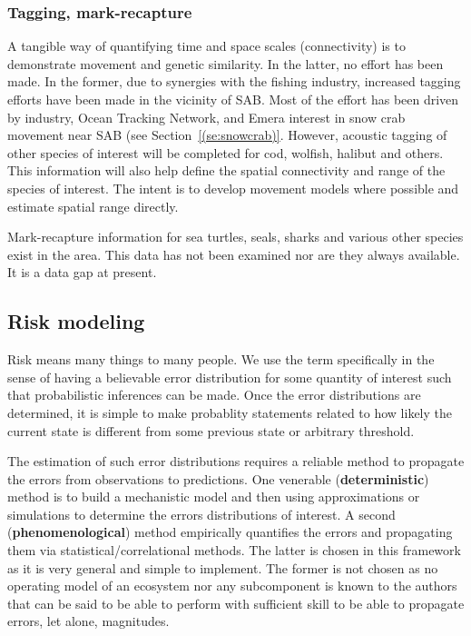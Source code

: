\documentclass[letterpaper,portrait,11pt]{scrartcl}
\numberwithin{equation}{section}		%
\numberwithin{figure}{section}		%
\numberwithin{table}{section}				%
\begin{document}
\subsubsection{Tagging, mark-recapture}

A tangible way of quantifying time and space scales (connectivity) is to demonstrate movement and genetic similarity. In the latter, no effort has been made.  In the former, due to synergies with the fishing industry, increased tagging efforts have been made in the vicinity of SAB. Most of the effort has been driven by industry, Ocean Tracking Network, and Emera interest in snow crab movement near SAB (see Section~\ref{(se:snowcrab)}. However, acoustic tagging of other species of interest will be completed for cod, wolfish, halibut and others. This information will also help define the spatial connectivity and range of the species of interest. The intent is to develop movement models where possible and estimate spatial range directly.  

Mark-recapture information for sea turtles, seals, sharks and various other species exist in the area. This data has not been examined nor are they always available. It is a data gap at present. 


\subsection{Risk modeling}
\label{sec:riskapproach}

Risk means many things to many people. We use the term specifically in the sense of having a believable error distribution for some quantity of interest such that probabilistic inferences can be made. Once the error distributions are determined, it is simple to make probablity statements related to how likely the current state is different from some previous state or arbitrary threshold. 

The estimation of such error distributions requires a reliable method to propagate the errors from observations to predictions. One venerable (\textbf{deterministic}) method is to build a mechanistic model and then using approximations or simulations to determine the errors distributions of interest. A second (\textbf{phenomenological}) method empirically quantifies the errors and propagating them via statistical/correlational methods. The latter is chosen in this framework as it is very general and simple to implement. The former is not chosen as no operating model of an ecosystem nor any subcomponent is known to the authors that can be said to be able to perform with sufficient skill to be able to propagate errors, let alone, magnitudes. 
\end{document}
